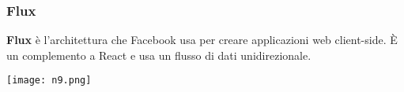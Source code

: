 \begin{frame}
\frametitle{Flux}
	\par
  	\textbf{Flux} è l’architettura che Facebook usa per creare applicazioni web client-side. È un complemento a React e usa un flusso di dati unidirezionale.\\
	\begin{flushleft}
		\texttt{[image: n9.png]}	
	\end{flushleft}			
\end{frame}



